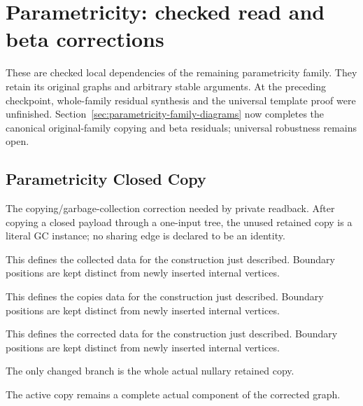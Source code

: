 \clearpage
\section{Parametricity: checked read and beta corrections}
\label{sec:parametricity-local-concordance}
These are checked local dependencies of the remaining parametricity family. They retain its original graphs and arbitrary stable arguments. At the preceding checkpoint, whole-family residual synthesis and the universal template proof were unfinished. Section~\ref{sec:parametricity-family-diagrams} now completes the canonical original-family copying and beta residuals; universal robustness remains open.

\subsection{Parametricity Closed Copy}
The copying/garbage-collection correction needed by private readback. After copying a closed payload through a one-input tree, the unused retained copy is a literal GC instance; no sharing edge is declared to be an identity.

This defines the collected data for the construction just described. Boundary positions are kept distinct from newly inserted internal vertices.
\par{}

This defines the copies data for the construction just described. Boundary positions are kept distinct from newly inserted internal vertices.
\par{}

This defines the corrected data for the construction just described. Boundary positions are kept distinct from newly inserted internal vertices.
\par{}

The only changed branch is the whole actual nullary retained copy.
\par{}

The active copy remains a complete actual component of the corrected graph.
\par{}

